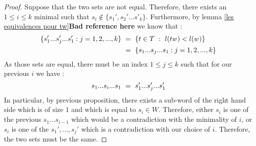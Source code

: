 \begin{proof}
	Suppose that the two sets are not equal. Therefore, there exists an $1\leq i\leq k$ minimal such that $s_i\not\in  \{s_1',s_2'...s'_k\}$. Furthermore, by lemma \ref{les equivalences pour tw}\textbf{Bad reference here} we know that :
	\begin{equation}
	\begin{split}
	\{s_1'...s_j'...s_1':j=1,2,...,k\}\text{ }&=\text{ } \{t\in T\text{ }:\text{ } l(tw)<l(w)\}\text{ }\\
	&=\text{ } \{s_1...s_j...s_1:j=1,2,...,k\}
	\end{split}
	\end{equation}
	As those sets are equal, there must be an index $1\leq j\leq k$ such that for our previous $i$ we have :
	\begin{equation}
	s_1...s_i...s_1\text{ }=\text{ } s_1'...s_j'...s_1'
	\end{equation}
	In particular, by previous proposition, there exists a sub-word of the right hand side which is of size $1$ and which is equal to $s_i\in W$. Therefore, either $s_i$ is one of the previous $s_1...s_{i-1}$ which would be a contradiction with the minimality of $i$, or $s_i$ is one of the $s_1',...,s_j'$ which is a contradiction with our choice of $i$. Therefore, the two sets must be the same.
\end{proof}
